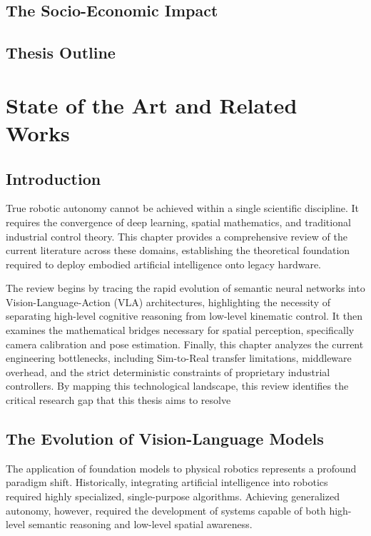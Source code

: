 \documentclass[a4paper, 12pt, twoside, openright]{book}
\begin{document}
\section{The Socio-Economic Impact}

\section{Thesis Outline}

\chapter{State of the Art and Related Works} %
\thispagestyle{empty}

\section{Introduction}

True robotic autonomy cannot be achieved within a single scientific discipline. It requires the convergence of deep learning, spatial mathematics, and traditional industrial control theory. This chapter provides a comprehensive review of the current literature across these domains, establishing the theoretical foundation required to deploy embodied artificial intelligence onto legacy hardware.

The review begins by tracing the rapid evolution of semantic neural networks into Vision-Language-Action (VLA) architectures, highlighting the necessity of separating high-level cognitive reasoning from low-level kinematic control. It then examines the mathematical bridges necessary for spatial perception, specifically camera calibration and pose estimation. Finally, this chapter analyzes the current engineering bottlenecks, including Sim-to-Real transfer limitations, middleware overhead, and the strict deterministic constraints of proprietary industrial controllers. By mapping this technological landscape, this review identifies the critical research gap that this thesis aims to resolve

\section{The Evolution of Vision-Language Models}

The application of foundation models to physical robotics represents a profound paradigm shift. Historically, integrating artificial intelligence into robotics required highly specialized, single-purpose algorithms. Achieving generalized autonomy, however, required the development of systems capable of both high-level semantic reasoning and low-level spatial awareness.
\end{document}
